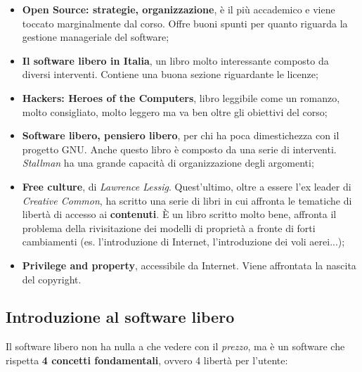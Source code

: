 \begin{itemize}

\item \textbf{Open Source: strategie, organizzazione}, è il più accademico e viene toccato marginalmente dal corso. Offre buoni spunti per quanto riguarda la gestione manageriale del software;
\item \textbf{Il software libero in Italia}, un libro molto interessante composto da diversi interventi. Contiene una buona sezione riguardante le licenze;
\item \textbf{Hackers: Heroes of the Computers}, libro leggibile come un romanzo, molto consigliato, molto leggero ma va ben oltre gli obiettivi del corso;
\item \textbf{Software libero, pensiero libero}, per chi ha poca dimestichezza con il progetto GNU. Anche questo libro è composto da una serie di interventi. \textit{Stallman} ha una grande capacità di organizzazione degli argomenti;
\item \textbf{Free culture}, di \textit{Lawrence Lessig}. Quest'ultimo, oltre a essere l'ex leader di \textit{Creative Common}, ha scritto una serie di libri in cui affronta le tematiche di libertà di accesso ai \textbf{contenuti}. È un libro scritto molto bene, affronta il problema della rivisitazione dei modelli di proprietà a fronte di forti cambiamenti (es. l'introduzione di Internet, l'introduzione dei voli aerei...);
\item \textbf{Privilege and property}, accessibile da Internet. Viene affrontata la nascita del copyright.

\end{itemize}

\subsection{Introduzione al software libero}

Il software libero non ha nulla a che vedere con il \textit{prezzo}, ma è un software che rispetta \textbf{4 concetti fondamentali}, ovvero 4 libertà per l'utente:

